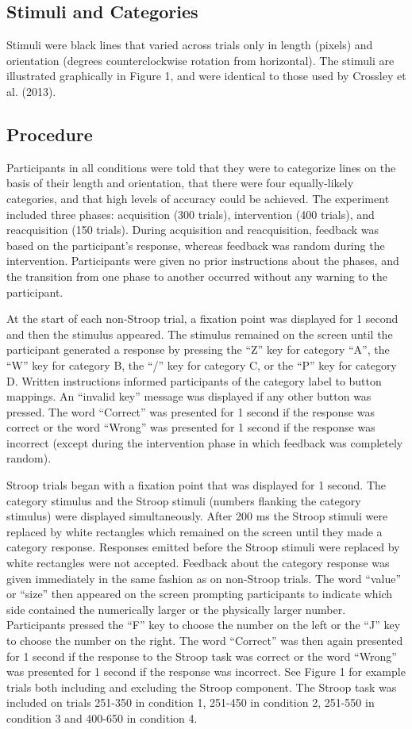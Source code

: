 \documentclass[man,apacite,draftfirst]{apa6} \usepackage{amsmath}
\begin{document}
\subsection*{Stimuli and Categories} Stimuli were black lines that varied across
trials only in length (pixels) and orientation (degrees counterclockwise
rotation from horizontal). The stimuli are illustrated graphically in Figure 1,
and were identical to those used by Crossley et al. (2013).

\subsection{Procedure} Participants in all conditions were told that they were
to categorize lines on the basis of their length and orientation, that there
were four equally-likely categories, and that high levels of accuracy could be
achieved. The experiment included three phases: acquisition (300 trials),
intervention (400 trials), and reacquisition (150 trials). During acquisition
and reacquisition, feedback was based on the participant's response, whereas
feedback was random during the intervention. Participants were given no prior
instructions about the phases, and the transition from one phase to another
occurred without any warning to the participant.

At the start of each non-Stroop trial, a fixation point was displayed for 1
second and then the stimulus appeared. The stimulus remained on the screen until
the participant generated a response by pressing the ``Z'' key for category
``A'', the ``W'' key for category B, the ``/'' key for category C, or the ``P''
key for category D. Written instructions informed participants of the category
label to button mappings. An ``invalid key'' message was displayed if any other
button was pressed. The word ``Correct'' was presented for 1 second if the
response was correct or the word ``Wrong'' was presented for 1 second if the
response was incorrect (except during the intervention phase in which feedback
was completely random).

Stroop trials began with a fixation point that was displayed for 1 second. The
category stimulus and the Stroop stimuli (numbers flanking the category
stimulus) were displayed simultaneously. After 200 ms the Stroop stimuli were
replaced by white rectangles which remained on the screen until they made a
category response. Responses emitted before the Stroop stimuli were replaced by
white rectangles were not accepted. Feedback about the category response was
given immediately in the same fashion as on non-Stroop trials. The word
``value'' or ``size'' then appeared on the screen prompting participants to
indicate which side contained the numerically larger or the physically larger
number. Participants pressed the ``F'' key to choose the number on the left or
the ``J'' key to choose the number on the right. The word ``Correct'' was then
again presented for 1 second if the response to the Stroop task was correct or
the word ``Wrong'' was presented for 1 second if the response was incorrect. See
Figure 1 for example trials both including and excluding the Stroop component.
The Stroop task was included on trials 251-350 in condition 1, 251-450 in
condition 2, 251-550 in condition 3 and 400-650 in condition 4.
\end{document}
